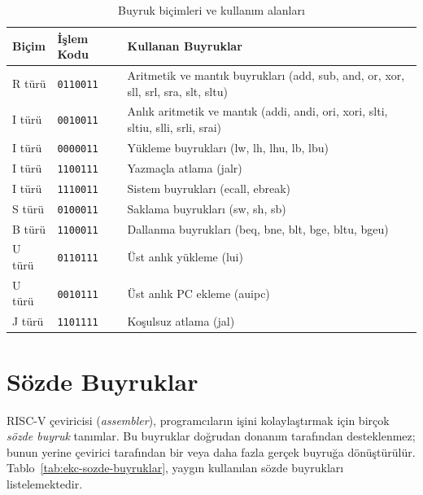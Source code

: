 \begin{table}[H]
\centering
\caption{Buyruk biçimleri ve kullanım alanları}\label{tab:ekc-format-ozet}
\begin{tabular}{llp{7cm}}
\toprule
\textbf{Biçim} & \textbf{İşlem Kodu} & \textbf{Kullanan Buyruklar} \\
\midrule
R türü & \texttt{0110011} & Aritmetik ve mantık buyrukları (add, sub, and, or, xor, sll, srl, sra, slt, sltu) \\
I türü & \texttt{0010011} & Anlık aritmetik ve mantık (addi, andi, ori, xori, slti, sltiu, slli, srli, srai) \\
I türü & \texttt{0000011} & Yükleme buyrukları (lw, lh, lhu, lb, lbu) \\
I türü & \texttt{1100111} & Yazmaçla atlama (jalr) \\
I türü & \texttt{1110011} & Sistem buyrukları (ecall, ebreak) \\
S türü & \texttt{0100011} & Saklama buyrukları (sw, sh, sb) \\
B türü & \texttt{1100011} & Dallanma buyrukları (beq, bne, blt, bge, bltu, bgeu) \\
U türü & \texttt{0110111} & Üst anlık yükleme (lui) \\
U türü & \texttt{0010111} & Üst anlık PC ekleme (auipc) \\
J türü & \texttt{1101111} & Koşulsuz atlama (jal) \\
\bottomrule
\end{tabular}
\end{table}


\section{Sözde Buyruklar}
\label{sec:ekc-sozde-buyruklar}

RISC-V çeviricisi (\emph{assembler}), programcıların işini kolaylaştırmak için birçok \emph{sözde buyruk} tanımlar. Bu buyruklar doğrudan donanım tarafından desteklenmez; bunun yerine çevirici tarafından bir veya daha fazla gerçek buyruğa dönüştürülür. Tablo~\ref{tab:ekc-sozde-buyruklar}, yaygın kullanılan sözde buyrukları listelemektedir.


